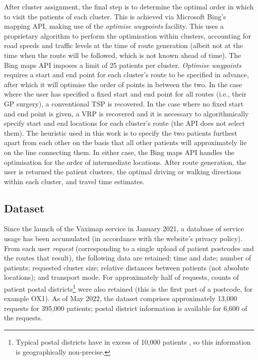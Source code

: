 \documentclass{article}
\def\vm{Vaximap}
\begin{document}
After cluster assignment, the final step is to determine the optimal order in which to visit the patients of each cluster. This is achieved via Microsoft Bing’s mapping API, making use of the \textit{optimise waypoints} facility. This uses a proprietary algorithm to perform the optimisation within clusters, accounting for road speeds and traffic levels at the time of route generation (albeit not at the time when the route will be followed, which is not known ahead of time). The Bing maps API imposes a limit of 25 patients per cluster. \textit{Optimise waypoints} requires a start and end point for each cluster's route to be specified in advance, after which it will optimise the order of points in between the two. In the case where the user has specified a fixed start and end point for all routes (i.e., their GP surgery), a conventional TSP is recovered. In the case where no fixed start and end point is given, a VRP is recovered and it is necessary to algorithmically specify start and end locations for each cluster's route (the API does not select them). The heuristic used in this work is to specify the two patients furthest apart from each other on the basis that all other patients will approximately lie on the line connecting them. In either case, the Bing maps API handles the optimisation for the order of intermediate locations. After route generation, the user is returned the patient clusters, the optimal driving or walking directions within each cluster, and travel time estimates. 

\subsection{Dataset}

Since the launch of the \vm{} service in January 2021, a database of service usage has been accumulated (in accordance with the website's privacy policy). From each user \textit{request} (corresponding to a single upload of patient postcodes and the routes that result), the following data are retained: time and date; number of patients; requested cluster size; relative distances between patients (not absolute locations); and transport mode. For approximately half of requests, counts of patient postal districts\footnote{Typical postal districts have in excess of 10,000 patients \cite{OfficeforNationalStatistics}, so this information is geographically non-precise.} were also retained (this is the first part of a postcode, for example OX1). As of May 2022, the dataset comprises approximately 13,000 requests for 395,000 patients; postal district information is available for 6,600 of the requests.
\end{document}
